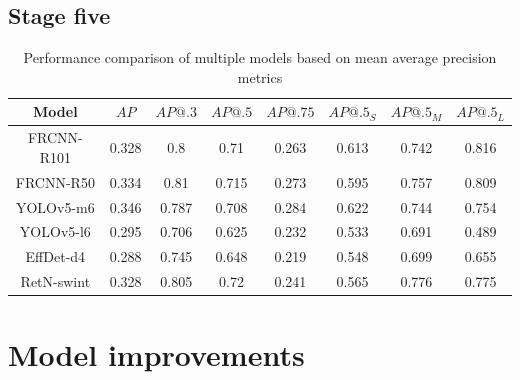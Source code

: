\subsection{Stage five}

\begin{table}[H]
    \begin{tabular}{|c|c|c|c|c|c|c|c|}
        \hline
        Model      & $AP$  & $AP@.3$ & $AP@.5$ & $AP@.75$ & $AP@.5_S$ & $AP@.5_M$ & $AP@.5_L$ \\ \hline
        FRCNN-R101 & 0.328 & 0.8     & 0.71    & 0.263    & 0.613     & 0.742     & 0.816     \\ \hline
        FRCNN-R50  & 0.334 & 0.81    & 0.715   & 0.273    & 0.595     & 0.757     & 0.809     \\ \hline
        YOLOv5-m6  & 0.346 & 0.787   & 0.708   & 0.284    & 0.622     & 0.744     & 0.754     \\ \hline
        YOLOv5-l6  & 0.295 & 0.706   & 0.625   & 0.232    & 0.533     & 0.691     & 0.489     \\ \hline
        EffDet-d4  & 0.288 & 0.745   & 0.648   & 0.219    & 0.548     & 0.699     & 0.655     \\ \hline
        RetN-swint & 0.328 & 0.805   & 0.72    & 0.241    & 0.565     & 0.776     & 0.775     \\ \hline
    \end{tabular}
    \caption{Performance comparison of multiple models based on mean average precision metrics}
    \label{tab:model_results:stage_five}
\end{table}

\section{Model improvements}
\label{sec:model_improvements_results}
